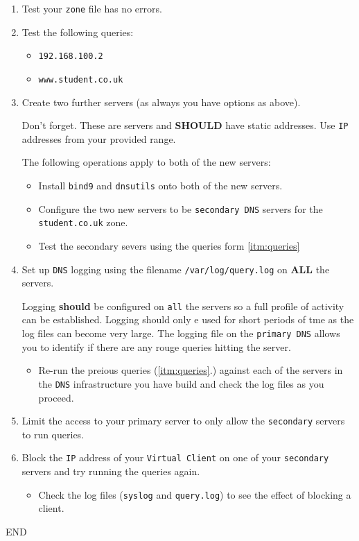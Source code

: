 \documentclass[11pt]{article}
\begin{document}
\begin{enumerate}
\begin{itemize}
\begin{itemize}
            \end{itemize}
        \end{itemize}
    \item Test your \texttt{zone} file has no errors.
    \item \label{itm:queries} Test the following queries:
        \begin{itemize}
            \item \texttt{192.168.100.2}
            \item \texttt{www.student.co.uk}
        \end{itemize}
    \item Create two further servers (as always you have options as above).
        \begin{tcolorbox}[title={\textbf{NOTE:}}]
            \noindent Don't forget. These are servers and \textbf{SHOULD} have static addresses. Use \texttt{IP} addresses from your provided range.
        \end{tcolorbox}
        \noindent The following operations apply to both of the new servers:
        \begin{itemize}
            \item Install \texttt{bind9} and \texttt{dnsutils} onto both of the new servers.
            \item Configure the two new servers to be \texttt{secondary DNS} servers for the \texttt{student.co.uk} zone.
            \item Test the secondary severs using the queries form \ref{itm:queries}
        \end{itemize}
    \item Set up \texttt{DNS} logging using the filename \texttt{/var/log/query.log} on \textbf{ALL} the servers.
        \begin{tcolorbox}[title={\textbf{NOTE:}}]
            \noindent Logging \textbf{should} be configured on \texttt{all} the servers so a full profile of activity can be established. Logging should only e used for short periods of tme as the log files can become very large. The logging file on the \texttt{primary DNS} allows you to identify if there are any rouge queries hitting the server.
        \end{tcolorbox}
        \begin{itemize}
            \item Re-run the preious queries (\ref{itm:queries}.) against each of the servers in the \texttt{DNS} infrastructure you have build and check the log files as you proceed.
        \end{itemize}
    \item Limit the access to your primary server to only allow the \texttt{secondary} servers to run queries.
    \item Block the \texttt{IP} address of your \texttt{Virtual Client} on one of your \texttt{secondary} servers and try running the queries again.
        \begin{itemize}
            \item Check the log files (\texttt{syslog} and \texttt{query.log}) to see the effect of blocking a client.
        \end{itemize}
\end{enumerate}    
END
\end{document}
